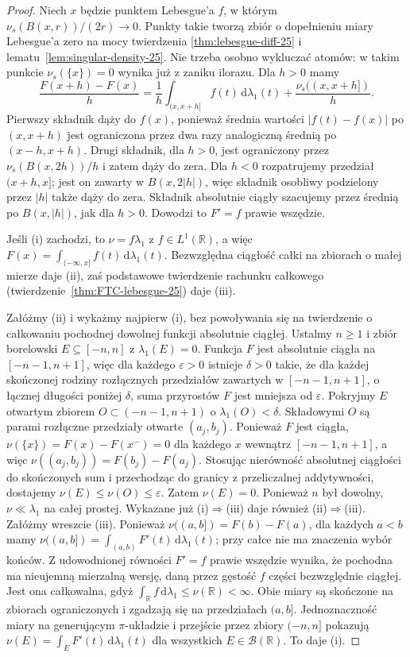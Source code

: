 \begin{proof}
Niech $x$ będzie punktem Lebesgue'a $f$, w którym
$\nu_s(B(x,r))/(2r)\to0$. Punkty takie tworzą zbiór
o dopełnieniu miary Lebesgue'a zero na mocy twierdzenia
\ref{thm:lebesgue-diff-25} i lematu~\ref{lem:singular-density-25}.
Nie trzeba osobno wykluczać atomów: w takim punkcie
$\nu_s(\{x\})=0$ wynika już z zaniku ilorazu.
Dla $h>0$ mamy
\[
 \frac{F(x+h)-F(x)}h
 =\frac1h\int_{(x,x+h]}f(t)\,\mathrm d\lambda_1(t)
 +\frac{\nu_s((x,x+h])}h.
\]
Pierwszy składnik dąży do $f(x)$, ponieważ średnia
wartości $|f(t)-f(x)|$ po $(x,x+h)$ jest ograniczona
przez dwa razy analogiczną średnią po $(x-h,x+h)$.
Drugi składnik, dla $h>0$, jest ograniczony przez
$\nu_s(B(x,2h))/h$ i zatem dąży do zera.
Dla $h<0$ rozpatrujemy przedział $(x+h,x]$;
jest on zawarty w $B(x,2|h|)$, więc składnik osobliwy
podzielony przez $|h|$ także dąży do zera.
Składnik absolutnie ciągły szacujemy przez średnią
po $B(x,|h|)$, jak dla $h>0$. Dowodzi to $F'=f$ prawie wszędzie.

Jeśli (i) zachodzi, to $\nu=f\lambda_1$ z
$f\in L^1(\mathbb R)$, a więc
$F(x)=\int_{(-\infty,x]}f(t)\,\mathrm d\lambda_1(t)$.
Bezwzględna ciągłość całki na zbiorach o małej mierze
daje (ii), zaś podstawowe twierdzenie rachunku
całkowego (twierdzenie~\ref{thm:FTC-lebesgue-25})
daje (iii).

Załóżmy (ii) i wykażmy najpierw (i), bez powoływania
się na twierdzenie o całkowaniu pochodnej dowolnej funkcji
absolutnie ciągłej. Ustalmy $n\ge1$ i zbiór borelowski
$E\subseteq[-n,n]$ z $\lambda_1(E)=0$. Funkcja $F$
jest absolutnie ciągła na $[-n-1,n+1]$, więc dla
każdego $\varepsilon>0$ istnieje $\delta>0$ takie,
że dla każdej skończonej rodziny rozłącznych przedziałów
zawartych w $[-n-1,n+1]$, o łącznej długości poniżej
$\delta$, suma przyrostów $F$ jest mniejsza od
$\varepsilon$. Pokryjmy $E$ otwartym zbiorem
$O\subset(-n-1,n+1)$ o $\lambda_1(O)<\delta$.
Składowymi $O$ są parami rozłączne przedziały otwarte
$(a_j,b_j)$. Ponieważ $F$ jest ciągła,
$\nu(\{x\})=F(x)-F(x^-)=0$ dla każdego $x$
wewnątrz $[-n-1,n+1]$, a więc
$\nu((a_j,b_j))=F(b_j)-F(a_j)$.
Stosując nierówność absolutnej ciągłości do skończonych
sum i przechodząc do granicy z przeliczalnej addytywności,
dostajemy $\nu(E)\le\nu(O)\le\varepsilon$.
Zatem $\nu(E)=0$. Ponieważ $n$ był dowolny,
$\nu\ll\lambda_1$ na całej prostej. Wykazane już
(i)$\Rightarrow$(iii) daje również (ii)$\Rightarrow$(iii).
Załóżmy wreszcie (iii). Ponieważ
$\nu((a,b])=F(b)-F(a)$, dla każdych $a<b$ mamy
$\nu((a,b])=\int_{(a,b)}F'(t)\,\mathrm d\lambda_1(t)$;
przy całce nie ma znaczenia wybór końców.
Z udowodnionej równości $F'=f$ prawie wszędzie
wynika, że pochodna ma nieujemną mierzalną wersję,
daną przez gęstość $f$ części bezwzględnie ciągłej.
Jest ona całkowalna, gdyż
$\int_{\mathbb R}f\,\mathrm d\lambda_1\le\nu(\mathbb R)<\infty$.
Obie miary są skończone na zbiorach
ograniczonych i zgadzają się na przedziałach $(a,b]$.
Jednoznaczność miary na generującym $\pi$-układzie
i przejście przez zbiory $(-n,n]$ pokazują
$\nu(E)=\int_EF'(t)\,\mathrm d\lambda_1(t)$
dla wszystkich $E\in\mathcal B(\mathbb R)$.
To daje (i).
\end{proof}

